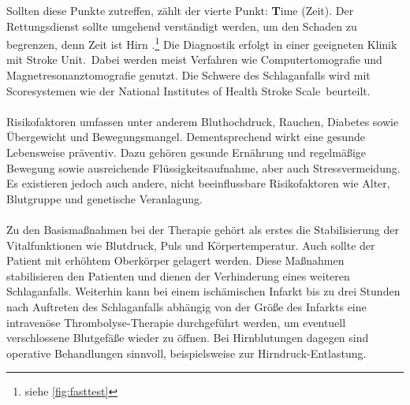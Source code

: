 Sollten diese Punkte zutreffen, zählt der vierte Punkt: \textbf{T}ime (Zeit). Der Rettungsdienst sollte umgehend verständigt werden, um den Schaden zu begrenzen, denn \glqq Zeit ist Hirn \grqq.\cite{Src:ApoFlex}\footnote[2]{siehe \autoref{fig:fasttest}}
Die Diagnostik erfolgt in einer geeigneten Klinik mit \glqq Stroke Unit\grqq .~Dabei werden meist Verfahren wie Computertomografie und Magnetresonanztomografie genutzt. Die Schwere des Schlaganfalls wird mit Scoresystemen wie der \glqq National Institutes of Health Stroke Scale\grqq ~beurteilt.
\\ \\
Risikofaktoren umfassen unter anderem Bluthochdruck, Rauchen, Diabetes sowie Übergewicht und Bewegungsmangel. Dementsprechend wirkt eine gesunde Lebensweise präventiv. Dazu gehören gesunde Ernährung und regelmäßige Bewegung sowie ausreichende Flüssigkeitsaufnahme, aber auch Stressvermeidung.\cite{Src:ApoFlex} Es existieren jedoch auch andere, nicht beeinflussbare Risikofaktoren wie Alter, Blutgruppe und genetische Veranlagung.
\\ \\
Zu den Basismaßnahmen bei der Therapie gehört als erstes die Stabilisierung der Vitalfunktionen wie Blutdruck, Puls und Körpertemperatur. Auch sollte der Patient mit erhöhtem Oberkörper gelagert werden. Diese Maßnahmen stabilisieren den Patienten und dienen der Verhinderung eines weiteren Schlaganfalls. Weiterhin kann bei einem ischämischen Infarkt bis zu drei Stunden nach Auftreten des Schlaganfalls abhängig von der Größe des Infarkts eine intravenöse Thrombolyse-Therapie durchgeführt werden, um eventuell verschlossene Blutgefäße wieder zu öffnen. Bei Hirnblutungen dagegen sind operative Behandlungen sinnvoll, beispielsweise zur Hirndruck-Entlastung.\cite{Src:ApoFlex}
